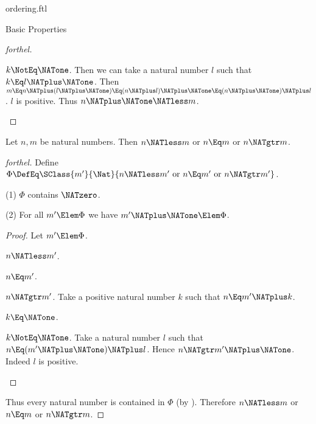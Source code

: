 \documentclass{stex}
\begin{document}
\begin{smodule}{ordering.ftl}
\begin{sfragment}{Basic Properties}
\begin{proof}[forthel]
    \begin{case}{$k \NotEq \NATone$.}
      Then we can take a natural number $l$ such that $k \Eq l \NATplus \NATone$.
      Then $m
        \Eq n \NATplus (l \NATplus \NATone)
        \Eq (n \NATplus l) \NATplus \NATone
        \Eq (n \NATplus \NATone) \NATplus l$.
      $l$ is positive.
      Thus $n \NATplus \NATone \NATless m$.
    \end{case}
  \end{proof}

  \begin{proposition}[forthel]
    Let $n, m$ be natural numbers.
    Then $n \NATless m$ or $n \Eq m$ or $n \NATgtr m$.
  \end{proposition}
  \begin{proof}[forthel]
    Define $\Phi \DefEq \SClass{m'}{\Nat}{n \NATless m'\text{ or }n \Eq m'\text{ or }n \NATgtr m'}$.

    (1) $\Phi$ contains $\NATzero$.

    (2) For all $m' \Elem \Phi$ we have $m' \NATplus \NATone \Elem \Phi$.
    \begin{proof}
      Let $m' \Elem \Phi$.

      \begin{case}{$n \NATless m'$.} \end{case}

      \begin{case}{$n \Eq m'$.} \end{case}

      \begin{case}{$n \NATgtr m'$.}
        Take a positive natural number $k$ such that $n \Eq m' \NATplus k$.

        \begin{case}{$k \Eq \NATone$.} \end{case}

        \begin{case}{$k \NotEq \NATone$.}
          Take a natural number $l$ such that $n \Eq (m' \NATplus \NATone) \NATplus l$.
          Hence $n \NATgtr m' \NATplus \NATone$.
          Indeed $l$ is positive.
        \end{case}
      \end{case}
    \end{proof}

    Thus every natural number is contained in $\Phi$ (by ).
    Therefore $n \NATless m$ or $n \Eq m$ or $n \NATgtr m$.
  \end{proof}


\end{sfragment}
\end{smodule}
\end{document}
